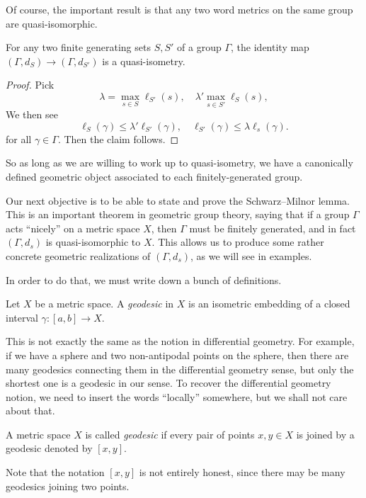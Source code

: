 \documentclass[a4paper]{article}
\begin{document}
Of course, the important result is that any two word metrics on the same group are quasi-isomorphic.
\begin{thm}
  For any two finite generating sets $S, S'$ of a group $\Gamma$, the identity map $(\Gamma, d_S) \to (\Gamma, d_{S'})$ is a quasi-isometry.
\end{thm}

\begin{proof}
  Pick
  \[
    \lambda = \max_{s \in S} \ell_{S'}(s),\quad \lambda' \max_{s \in S'} \ell_{S}(s),
  \]
  We then see
  \[
    \ell_S(\gamma) \leq \lambda' \ell_{S'}(\gamma), \quad \ell_{S'}(\gamma) \leq \lambda \ell_s(\gamma). %
  \]
  for all $\gamma \in \Gamma$. Then the claim follows.
\end{proof}
So as long as we are willing to work up to quasi-isometry, we have a canonically defined geometric object associated to each finitely-generated group.

Our next objective is to be able to state and prove the Schwarz--Milnor lemma. This is an important theorem in geometric group theory, saying that if a group $\Gamma$ acts ``nicely'' on a metric space $X$, then $\Gamma$ must be finitely generated, and in fact $(\Gamma, d_s)$ is quasi-isomorphic to $X$. This allows us to produce some rather concrete geometric realizations of $(\Gamma, d_s)$, as we will see in examples.

In order to do that, we must write down a bunch of definitions.

\begin{defi}[Geodesic]
  Let $X$ be a metric space. A \emph{geodesic} in $X$ is an isometric embedding of a closed interval $\gamma: [a, b] \to X$.
\end{defi}
This is not exactly the same as the notion in differential geometry. For example, if we have a sphere and two non-antipodal points on the sphere, then there are many geodesics connecting them in the differential geometry sense, but only the shortest one is a geodesic in our sense. To recover the differential geometry notion, we need to insert the words ``locally'' somewhere, but we shall not care about that.

\begin{defi}
  A metric space $X$ is called \emph{geodesic} if every pair of points $x, y \in X$ is joined by a geodesic denoted by $[x, y]$.
\end{defi}
Note that the notation $[x, y]$ is not entirely honest, since there may be many geodesics joining two points.
\end{document}
